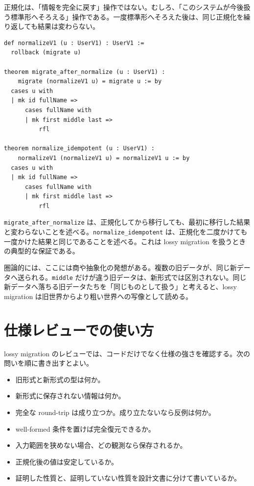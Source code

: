 \begin{intuitionbox}
正規化は、「情報を完全に戻す」操作ではない。むしろ、「このシステムが今後扱う標準形へそろえる」操作である。一度標準形へそろえた後は、同じ正規化を繰り返しても結果は変わらない。
\end{intuitionbox}

\begin{listing}[htbp]
\begin{verbatim}
def normalizeV1 (u : UserV1) : UserV1 :=
  rollback (migrate u)

theorem migrate_after_normalize (u : UserV1) :
    migrate (normalizeV1 u) = migrate u := by
  cases u with
  | mk id fullName =>
      cases fullName with
      | mk first middle last =>
          rfl

theorem normalize_idempotent (u : UserV1) :
    normalizeV1 (normalizeV1 u) = normalizeV1 u := by
  cases u with
  | mk id fullName =>
      cases fullName with
      | mk first middle last =>
          rfl
\end{verbatim}
\caption{lossy migration を正規化として見る}
\label{lst:ch23-normalize}
\end{listing}

\texttt{migrate\_after\_normalize} は、正規化してから移行しても、最初に移行した結果と変わらないことを述べる。\texttt{normalize\_idempotent} は、正規化を二度かけても一度かけた結果と同じであることを述べる。これは lossy migration を扱うときの典型的な保証である。

圏論的には、ここには商や抽象化の発想がある。複数の旧データが、同じ新データへ送られる。\texttt{middle} だけが違う旧データは、新形式では区別されない。同じ新データへ落ちる旧データたちを「同じものとして扱う」と考えると、lossy migration は旧世界からより粗い世界への写像として読める。


\section{仕様レビューでの使い方}

lossy migration のレビューでは、コードだけでなく仕様の強さを確認する。次の問いを順に書き出すとよい。

\begin{softwarebox}
\begin{itemize}
\item 旧形式と新形式の型は何か。
\item 新形式に保存されない情報は何か。
\item 完全な round-trip は成り立つか。成り立たないなら反例は何か。
\item well-formed 条件を置けば完全復元できるか。
\item 入力範囲を狭めない場合、どの観測なら保存されるか。
\item 正規化後の値は安定しているか。
\item 証明した性質と、証明していない性質を設計文書に分けて書いているか。
\end{itemize}
\end{softwarebox}

